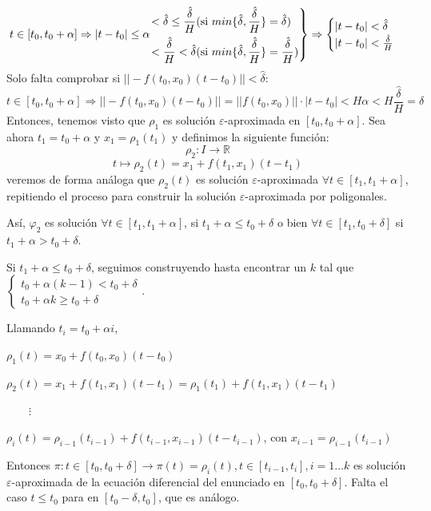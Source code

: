 \documentclass[11pt, a4paper,twoside]{article}
\makeatletter
\theoremstyle{theorem-style}  %
\renewenvironment{proof}[1][\proofname]{\par
	\pushQED{\qed}%
	\normalfont \topsep6\p@\@plus6\p@\relax
	\list{}{%
		\settowidth{\leftmargin}{\quad:\hskip\labelsep}%
		\setlength{\labelwidth}{0pt}%
		\setlength{\itemindent}{-\leftmargin}%
	}%
	\item[\hskip\labelsep\itshape#1\@addpunct{:}]\ignorespaces
}{%
	\popQED\endlist\@endpefalse
}
\theoremstyle{definition-style}
\theoremstyle{example-style}
\newenvironment{rcases}
{\left.\begin{aligned}}
	{\end{aligned}\right\rbrace}
\makeatother
\begin{document}
\begin{proof}
	\[ t \in [t_0, t_0+\alpha]\Rightarrow |t-t_0|\leq \alpha  
	\begin{rcases}
	< \hat{\delta}\leq\frac{\hat{\delta}}{H} \text{(si } min\{ \hat{\delta}, \frac{\hat{\delta}}{H}\}= \hat{\delta})\ \  \\
	< \frac{\hat{\delta}}{H}<\hat{\delta} \text{(si }  min\{ \hat{\delta}, \frac{\hat{\delta}}{H}\}=  \frac{\hat{\delta}}{H})
	\end{rcases}\Rightarrow \begin{cases}
	|t-t_0|<\hat{\delta}\\
	|t-t_0|<\frac{\hat{\delta}}{H}
	\end{cases}
	 \]
	 Solo falta comprobar si $ || -f(t_0,x_0)(t-t_0)||< \hat{\delta} $:	 
	  \[ t \in [t_0, t_0+\alpha]\Rightarrow ||-f(t_0,x_0)(t-t_0)|| = || f(t_0,x_0)||\cdot|t-t_0|<H\alpha < H \frac{\hat{\delta}}{H}= \hat{\delta}   \]
	Entonces, tenemos visto que $ \rho_1 $ es solución $ \varepsilon $-aproximada en $ [t_0,t_0+\alpha] $. Sea ahora $ t_1=t_0+\alpha $ y $ x_1=\rho_1(t_1) $ y definimos la siguiente función:
	\[ \rho_2:I\longrightarrow \mathbb{R} \]
	\[ t \longmapsto \rho_2(t)=x_1+f(t_1,x_1)(t-t_1) \]
	veremos de forma análoga que $ \rho_2(t) $ es solución $ \varepsilon $-aproximada $  \forall t \in [t_1,t_1+\alpha]  $, repitiendo el proceso para construir la solución $ \varepsilon $-aproximada por poligonales. 
	
	
	Así, $ \varphi_2 $ es solución $ \forall t \in [t_1,t_1+\alpha] $, si $ t_1+\alpha\leq t_0+\delta $ o bien $\forall t \in [t_1, t_0+\delta] $ si $ t_1+\alpha >t_0+\delta $. 
	
	Si $ t_1+\alpha \leq t_0 +\delta $, seguimos construyendo hasta encontrar un $ k $ tal que $ \begin{cases}
	t_0+\alpha (k-1)<t_0+\delta\\
	t_0+\alpha k\geq t_0 +\delta
	\end{cases} $.
	
	Llamando $ t_i=t_0+\alpha i $,
	
	\begin{adjustwidth}{1cm}{}
		$ \rho_1(t)=x_0+f(t_0,x_0)(t-t_0) $
	
		$ \rho_2(t)=x_1+f(t_1,x_1)(t-t_1)=\rho_1(t_1)+f(t_1,x_1)(t-t_1) $
	
		$ \qquad \vdots $
	
		$\rho_i (t)=\rho_{i-1}(t_{i-1})+f(t_{i-1},x_{i-1})(t-t_{i-1})  $, con $ x_{i-1}=\rho_{i-1}(t_{i-1}) $
	\end{adjustwidth}

	Entonces $ \pi: t \in [t_0, t_0+\delta]\longrightarrow \pi(t)=\rho_i(t), t \in [t_{i-1}, t_i], i=1\dots k  $ es solución $ \varepsilon $-aproximada de la ecuación diferencial del enunciado en $ [t_0, t_0+\delta] $. Falta el caso $ t\leq t_0 $ para en $ [t_0-\delta, t_0] $, que es análogo.
\end{proof}
\end{document}
